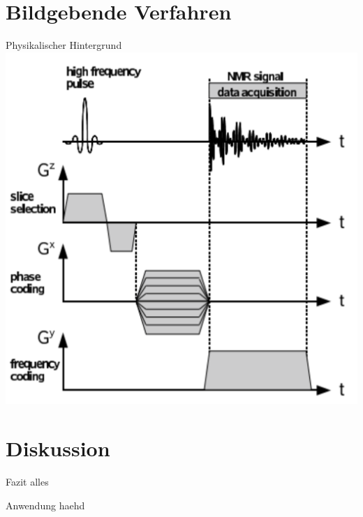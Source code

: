 




\section{Bildgebende Verfahren} %
\begin{frame}{Physikalischer Hintergrund}
\includegraphics[scale=.1]{images//signal.png}
\end{frame}




\section{Diskussion}
\begin{frame}{Fazit}
alles
\end{frame}

\begin{frame}{Anwendung}
haehd
\end{frame}